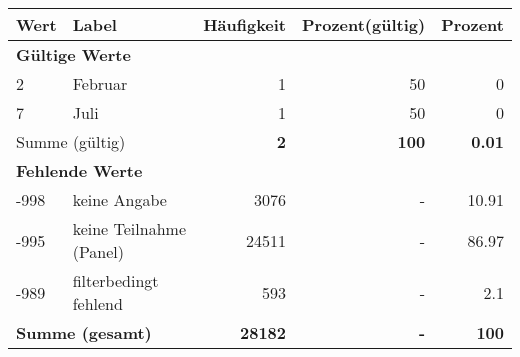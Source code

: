      \begin{longtable}{lXrrr}
     \toprule
     \textbf{Wert} & \textbf{Label} & \textbf{Häufigkeit} & \textbf{Prozent(gültig)} & \textbf{Prozent} \\
     \endhead
     \midrule
     \multicolumn{5}{l}{\textbf{Gültige Werte}}\\

     2 &
     \multicolumn{1}{X}{ Februar   } &


       \num{1} &
       \num[round-mode=places,round-precision=2]{50} &
         \num[round-mode=places,round-precision=2]{0} \\

     7 &
     \multicolumn{1}{X}{ Juli   } &


       \num{1} &
       \num[round-mode=places,round-precision=2]{50} &
         \num[round-mode=places,round-precision=2]{0} \\
     \midrule
     \multicolumn{2}{l}{Summe (gültig)} &
       \textbf{\num{2}} &
     \textbf{100} &
       \textbf{\num[round-mode=places,round-precision=2]{0.01}} \\
     \multicolumn{5}{l}{\textbf{Fehlende Werte}}\\
       -998 &
       keine Angabe &
         \num{3076} &
        - &
         \num[round-mode=places,round-precision=2]{10.91} \\
       -995 &
       keine Teilnahme (Panel) &
         \num{24511} &
        - &
         \num[round-mode=places,round-precision=2]{86.97} \\
       -989 &
       filterbedingt fehlend &
         \num{593} &
        - &
         \num[round-mode=places,round-precision=2]{2.1} \\
     \midrule
     \multicolumn{2}{l}{\textbf{Summe (gesamt)}} &
          \textbf{\num{28182}} &
        \textbf{-} &
        \textbf{100} \\
     \bottomrule
     \end{longtable}
     
